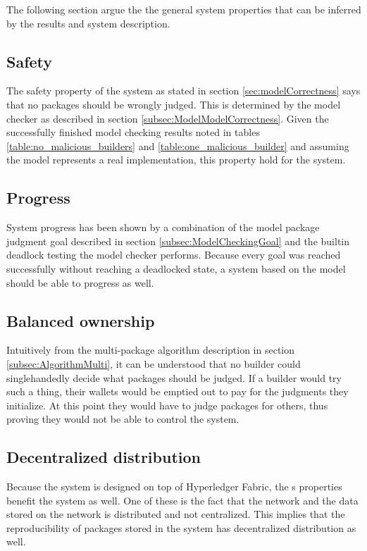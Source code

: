 The following section argue the the general system properties that can be inferred by the results and system description.

\subsection{Safety}
\label{subsec:AnalysisSafety}

The safety property of the system as stated in section \ref{sec:modelCorrectness} says that no packages should be wrongly judged. This is determined by the model checker as described in section \ref{subsec:ModelModelCorrectness}. Given the successfully finished model checking results noted in tables \ref{table:no_malicious_builders} and \ref{table:one_malicious_builder} and assuming the model represents a real implementation, this property hold for the system.

\subsection{Progress}
\label{subsec:AnalysisProgress}

System progress has been shown by a combination of the model package judgment goal described in section \ref{subsec:ModelCheckingGoal} and the builtin deadlock testing the model checker performs. Because every goal was reached successfully without reaching a deadlocked state, a system based on the model should be able to progress as well.

\subsection{Balanced ownership}
\label{subsec:AnalysisBalanced}

Intuitively from the multi-package algorithm description in section \ref{subsec:AlgorithmMulti}, it can be understood that no builder could singlehandedly decide what packages should be judged. If a builder would try such a thing, their wallets would be emptied out to pay for the judgments they initialize. At this point they would have to judge packages for others, thus proving they would not be able to control the system.

\subsection{Decentralized distribution}
\label{subsec:AnalysisDecentralized}

Because the system is designed on top of Hyperledger Fabric, the s properties benefit the system as well. One of these is the fact that the network and the data stored on the network is distributed and not centralized. This implies that the reproducibility of packages stored in the system has decentralized distribution as well.

